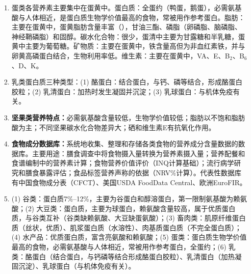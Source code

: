 {\begin{enumerate}[leftmargin=*, itemsep=5pt]
    \item 蛋类各营养素主要集中在蛋黄中。蛋白质：全蛋约（鸭蛋，鹅蛋），必需氨基酸与人体相近，是蛋白质生物学价值最高的食物，常被用作参考蛋白。脂肪：主要在蛋黄中，蛋黄脂肪含量丰富（），甘油三酯、磷脂（卵磷脂、脑磷脂、神经鞘磷脂）和固醇。碳水化合物：很少，蛋清中主要为甘露糖和半乳糖，蛋黄中主要为葡萄糖。矿物质：主要在蛋黄中，铁含量高但为非血红素铁，并与卵黄高磷蛋白结合，生物利用率低。维生素：主要在蛋黄中，VA、E、B$_2$、B$_6$、D、K。
    \item 乳类蛋白质三种类型：(1) 酪蛋白：结合蛋白，与钙、磷等结合，形成酪蛋白胶粒；(2) 乳清蛋白：加热时发生凝固并沉淀；(3) 乳球蛋白：与机体免疫有关。
    \item \textbf{坚果类营养特点：}必需氨基酸含量较低，生物学价值较低；脂肪以不饱和脂肪酸为主；不同坚果碳水化合物差异大；硒和维生素E有抗氧化作用。
    \item \textbf{食物成分数据库：}系统地收集、整理和存储各类食物的营养成分含量数据的数据库。主要用途：膳食调查中将食物摄入量转换为营养素摄入量；营养配餐和食谱编制中的营养素计算；食物营养价值评价（INQ计算基础）；流行病学研究和膳食暴露评估；食品标签营养声称的依据（NRV\%计算）。代表性数据库有中国食物成分表（CFCT）、美国USDA FoodData Central、欧洲EuroFIR。
    \item (1) 谷类：蛋白质7\%--12\%，主要为谷蛋白和醇溶蛋白，第一限制氨基酸为赖氨酸；(2) 大豆类：蛋白质，主要为球蛋白，赖氨酸含量较高，属于优质蛋白质，与谷类互补（谷类缺赖氨酸、大豆缺蛋氨酸）；(3) 畜肉类：肌原纤维蛋白质（丝状，优质）、肌浆蛋白质（水溶性）、肉基质蛋白质（不完全蛋白质）；(4) 水产品：优质蛋白质，富含亮氨酸和赖氨酸；(5) 蛋类：蛋白质生物学价值最高的食物，必需氨基酸与人体相近，常被用作参考蛋白，全蛋约；(6) 乳类：酪蛋白（结合蛋白，与钙磷等结合形成酪蛋白胶粒）、乳清蛋白（加热凝固沉淀）、乳球蛋白（与机体免疫有关）。
\end{enumerate}

\newpage
}
